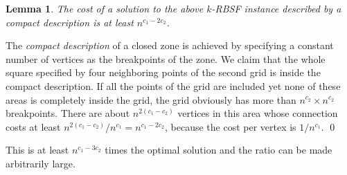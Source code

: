 \documentclass[extras,11pt]{article} \usepackage{fullpage}
\theoremstyle{mytheorem}
\newtheorem{lemma}[theorem]{Lemma}
\renewenvironment{proof}{\par\noindent{\bf Proof.}\hspace{0.5em}}
    {\hfill\qed\vspace{1ex}}
\begin{document}
\begin{lemma}\label{lem:2nd-cand}
The cost of a solution to the above $k$-RBSF instance described by a compact description is at least $n^{c_1-2c_2}$.
\end{lemma}
\begin{proof}
The \emph{compact description} of a closed zone is achieved by specifying
a constant number of vertices as the breakpoints of the zone.
We claim that the whole square specified by four neighboring points of the second grid is inside the compact description.
If all the points of the grid are included yet none of these areas is completely inside the grid,
the grid obviously has more than $n^{c_2}\times n^{c_2}$ breakpoints.
There are about $n^{2(c_1-c_2)}$ vertices in this area whose connection costs at least $n^{2(c_1-c_2)}/n^{c_1}=n^{c_1-2c_2}$,
because the cost per vertex is $1/n^{c_1}$.
\end{proof}

This is at least $n^{c_1-3c_2}$ times the optimal solution and the ratio can be made arbitrarily large.

\fi
\end{document}
